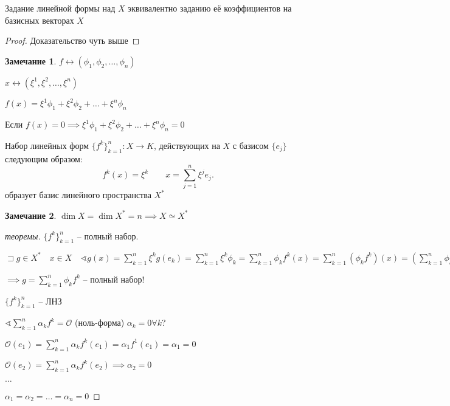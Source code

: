 \documentclass{book}
\theoremstyle{definition}
\newtheorem*{note}{Замечание}
\begin{document}
\begin{lemma}
    Задание линейной формы над $X$ эквивалентно заданию её коэффициентов на базисных векторах $X$
\end{lemma}
\begin{proof}
    Доказательство чуть выше
\end{proof}
\begin{note}
    $f \longleftrightarrow \left( \phi_1, \phi_2, \ldots, \phi_n \right) $

    $x \longleftrightarrow \left( \xi^1, \xi^2, \ldots, \xi^n \right) $

    $f(x) = \xi^1\phi_1 + \xi^2\phi_2 + \ldots + \xi^n\phi_n$

    Если $f(x) = 0 \implies  \xi^1\phi_1 + \xi^2\phi_2 + \ldots + \xi^n\phi_n = 0$
\end{note}

\begin{theorem}
    [О базисе  $X^*$]
    Набор линейных форм $\{f^k\}_{k=1}^n:X\to K$, действующих на  $X$ с базисом  $\{e_j\}$ следующим образом:  \[
        f^k(x) = \xi^k\qquad x = \sum_{j=1}^{n} \xi^je_j
    .\] 
    образует базис линейного пространства $X^*$
\end{theorem}
\begin{note}
    $\dim X = \dim X^* = n \implies X\simeq X^*$
\end{note}
\begin{proof}
    [теоремы]
    $\{f^k\}_{k=1}^n$ -- полный набор.

    $\sqsupset g\in X^*\quad x\in X\quad \sphericalangle g(x) = \sum_{k=1}^{n} \xi^kg\left( e_k \right) = \sum_{k=1}^{n} \xi^k\phi_k = \sum_{k=1}^{n} \phi_kf^k\left( x \right) = \sum_{k=1}^{n} \left( \phi_kf^k \right) (x) = \left( \sum_{k=1}^{n} \phi_kf^k \right) (x)$

    $\implies g = \sum_{k=1}^{n} \phi_kf^k$ -- полный набор!

    $\{f^k\}_{k=1}^n$ -- ЛНЗ

    $\sphericalangle \sum_{k=1}^{n} \alpha_kf^k = \mathcal O$ (ноль-форма) $\alpha_k = 0\forall k$?

    $\mathcal O(e_1) = \sum_{k=1}^{n} \alpha_kf^k\left( e_1 \right)  = \alpha_1f^1\left( e_1 \right)  = \alpha_1 = 0$ 

    $\mathcal O\left( e_2 \right)  = \sum_{k=1}^{n} \alpha_kf^k\left( e_2 \right) \implies \alpha_2 = 0$ 

    $\ldots$

    $\alpha_1 = \alpha_2 = \ldots = \alpha_n = 0$
\end{proof}
\end{document}

